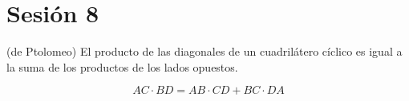 \section{Sesión 8}

\begin{teorema}(de Ptolomeo)
	El producto de las diagonales de un cuadrilátero cíclico es igual a la suma de los productos de los lados opuestos. 
\end{teorema}

\begin{teorema}
	$$AC\cdot BD=AB\cdot CD+BC\cdot DA$$
\end{teorema}
